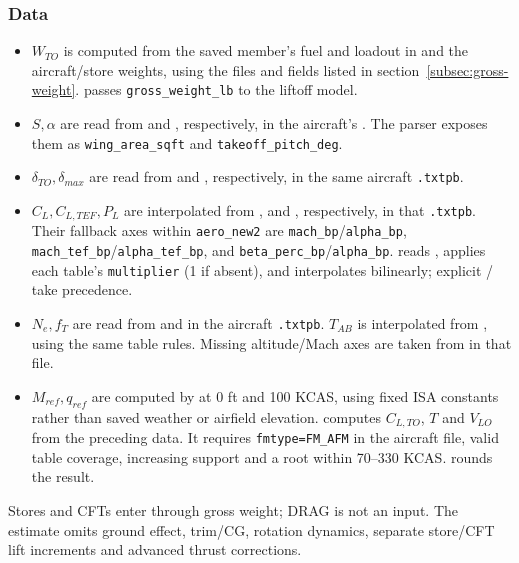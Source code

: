 \documentclass[10pt,a4paper]{amsart}
\begin{document}
\subsubsection*{Data}
\begin{itemize}
\setlength{\itemsep}{0pt}
\setlength{\parsep}{0pt}
\item $W_{TO}$ is computed from the saved member's fuel and loadout in
 and the aircraft/store weights, using the files and
fields listed in section~\ref{subsec:gross-weight}.  passes
\texttt{gross\_weight\_lb} to the liftoff model.
\item $S,\alpha$ are read from  and
, respectively, in the
aircraft's . The parser
 exposes them as
\texttt{wing\_area\_sqft} and \texttt{takeoff\_pitch\_deg}.
\item $\delta_{TO},\delta_{max}$ are read from
 and ,
respectively, in the same aircraft \texttt{.txtpb}.
\item $C_L,C_{L,TEF},P_L$ are interpolated from
,  and
, respectively, in that \texttt{.txtpb}.
Their fallback axes within \texttt{aero\_new2} are
\texttt{mach\_bp}/\texttt{alpha\_bp},
\texttt{mach\_tef\_bp}/\texttt{alpha\_tef\_bp}, and
\texttt{beta\_perc\_bp}/\texttt{alpha\_bp}.
 reads , applies each table's
\texttt{multiplier} (1 if absent), and interpolates bilinearly; explicit
/ take precedence.
\item $N_e,f_T$ are read from  and
 in the aircraft \texttt{.txtpb}.
$T_{AB}$ is interpolated from ,
using the same table rules. Missing altitude/Mach axes are taken from
 in that file.
\item $M_{ref},q_{ref}$ are computed by
 at 0 ft and 100 KCAS, using fixed ISA
constants rather than saved weather or airfield elevation.
 computes $C_{L,TO}$, $T$ and
$V_{LO}$ from the preceding data. It requires \texttt{fmtype=FM\_AFM}
in the aircraft file, valid table coverage, increasing support and a
root within 70--330 KCAS.  rounds the result.
\end{itemize}
Stores and CFTs enter through gross weight; DRAG is not an input.
The estimate omits ground effect, trim/CG, rotation dynamics, separate
store/CFT lift increments and advanced thrust corrections.
\end{document}
